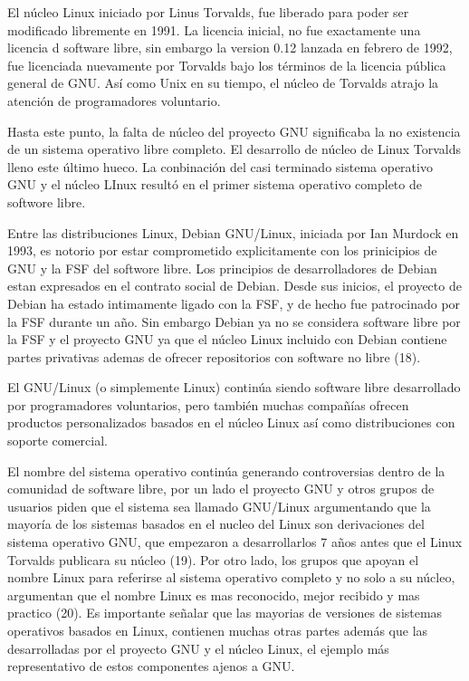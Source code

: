 El núcleo Linux iniciado por Linus Torvalds, fue liberado para poder ser modificado libremente en 1991. La licencia inicial, no fue exactamente una licencia d software libre, sin embargo la version 0.12 lanzada en febrero de 1992, fue licenciada nuevamente por Torvalds bajo los términos de la licencia pública general de GNU. Así como Unix en su tiempo, el núcleo de Torvalds atrajo la atención de programadores voluntario.

Hasta este punto, la falta de núcleo del proyecto GNU significaba la no existencia de un sistema operativo libre completo. El desarrollo de núcleo de Linux Torvalds lleno este último hueco. La conbinación del casi terminado sistema operativo GNU y el núcleo LInux resultó en el primer sistema operativo completo de softwore libre.

Entre las distribuciones Linux, Debian GNU/Linux, iniciada por Ian Murdock en 1993, es notorio por estar comprometido explicitamente con los prinicipios de GNU y la FSF del softwore libre. Los principios de desarrolladores de Debian estan expresados en el contrato social de Debian. Desde sus inicios, el proyecto de Debian ha estado intimamente ligado con la FSF, y de hecho fue patrocinado por la FSF durante un año. Sin embargo Debian ya no se considera software libre por la FSF y el proyecto GNU ya que el núcleo Linux incluido con Debian contiene partes privativas ademas de ofrecer repositorios con software no libre (18).

El GNU/Linux (o simplemente Linux) continúa siendo software libre desarrollado por programadores voluntarios, pero también muchas compañías ofrecen productos personalizados basados en el núcleo Linux así como distribuciones con soporte comercial.

El nombre del sistema operativo continúa generando controversias dentro de la comunidad de software libre, por un lado el proyecto GNU y otros grupos de usuarios piden que el sistema sea llamado GNU/Linux argumentando que la mayoría de los sistemas basados en el nucleo del Linux son derivaciones del sistema operativo GNU, que empezaron a desarrollarlos 7 años antes que el Linux Torvalds publicara su núcleo (19). Por otro lado, los grupos que apoyan el nombre Linux para referirse al sistema operativo completo y no solo a su núcleo, argumentan que el nombre Linux es mas reconocido, mejor recibido y mas practico (20). Es importante señalar que las mayorias de versiones de sistemas operativos basados en Linux, contienen muchas otras partes además que las desarrolladas por el proyecto GNU y el núcleo Linux, el ejemplo más representativo de estos componentes ajenos a GNU.

